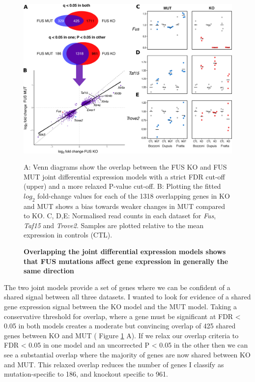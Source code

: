 \begin{figure}[h!]
	\centering
	\includegraphics[width=\textwidth]{Figures/06_fus_meta/expression_multi.png}
	\caption{\textbf{Overlapping the joint differential expression models shows that FUS mutations affect gene expression in generally the same direction}}
	A: Venn diagrams show the overlap between the FUS KO and FUS MUT joint differential expression models with a strict FDR cut-off (upper) and a more relaxed P-value cut-off. 
	B: Plotting the fitted $log_2$ fold-change values for each of the 1318 overlapping genes in KO and MUT shows a bias towards weaker changes in MUT compared to KO.
	C, D,E: Normalised read counts in each dataset for \textit{Fus}, \textit{Taf15} and \textit{Trove2}. Samples are plotted relative to the mean expression in controls (CTL).
	\label{fig:fus_expression_multipanel}
\end{figure}

The two joint models provide a set of genes where we can be confident of a shared signal between all three datasets.  
I wanted to look for evidence of a shared gene expression signal between the KO model and the MUT model.
Taking a conservative threshold for overlap, where a gene must be significant at FDR < 0.05 in both models creates a moderate but convincing overlap of 425 shared genes between KO and MUT ( Figure \ref{fig:fus_expression_multipanel} A). 
If we relax our overlap criteria to FDR < 0.05 in one model and an uncorrected P < 0.05 in the other then we can see a substantial overlap where the majority of genes are now shared between KO and MUT. 
This relaxed overlap reduces the number of genes I classify as mutation-specific to 186, and knockout specific to 961.

